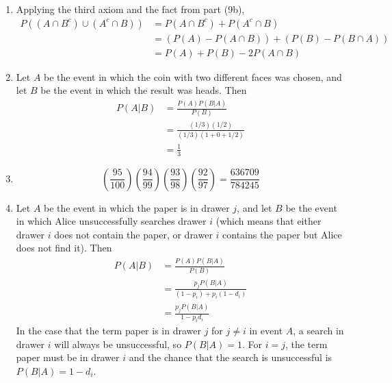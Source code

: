 \documentclass[a4paper,12pt]{article}
\begin{document}
\begin{enumerate}
	\item Applying the third axiom and the fact from part (9b),
	\begin{align*}
		P((A \cap B^c) \cup (A^c \cap B)) &= P(A \cap B^c) + P(A^c \cap B) \\
		&= \left( P(A) - P(A \cap B) \right) + \left( P(B) - P(B \cap A) \right) \\
		&= P(A) + P(B) - 2P(A \cap B)
	\end{align*}

	\setcounter{enumi}{15}
	\item Let $A$ be the event in which the coin with two different faces was chosen, and let $B$ be the event in which the result was heads. Then
	\begin{align*}
		P(A | B) &= \frac{P(A) P(B | A)}{P(B)} \\
		&= \frac{(1 / 3) (1 / 2)}{(1 / 3) (1 + 0 + 1 / 2)} \\
		&= \frac{1}{3}
	\end{align*}
	
	\item
	\[ \left( \frac{95}{100} \right) \left( \frac{94}{99} \right) \left( \frac{93}{98} \right) \left( \frac{92}{97} \right) = \frac{636709}{784245} \]
	
	\setcounter{enumi}{18}
	\item Let $A$ be the event in which the paper is in drawer $j$, and let $B$ be the event in which Alice unsuccessfully searches drawer $i$ (which means that either drawer $i$ does not contain the paper, or drawer $i$ contains the paper but Alice does not find it). Then
	\begin{align*}
		P(A | B) &= \frac{P(A) P(B | A)}{P(B)} \\
		&= \frac{p_j P(B | A)}{(1 - p_i) + p_i(1 - d_i)} \\
		&= \frac{p_j P(B | A)}{1 - p_id_i}
	\end{align*}
	In the case that the term paper is in drawer $j$ for $j \neq i$ in event $A$, a search in drawer $i$ will always be unsuccessful, so $P(B | A) = 1$. For $i = j$, the term paper must be in drawer $i$ and the chance that the search is unsuccessful is $P(B | A) = 1 - d_i$.

\end{enumerate}
\end{document}
